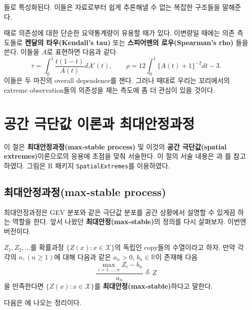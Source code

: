 \documentclass[b5paper,]{scrbook}
\theoremstyle{plain}
\theoremstyle{definition}
\numberwithin{equation}{section}
\let\BeginKnitrBlock\begin \let\EndKnitrBlock\end
\begin{document}
들로 특성화된다. 이들은 자료로부터 쉽게 추론해낼 수 없는 복잡한 구조들을 말해준다.

때로 의존성에 대한 단순한 요약통계량이 유용할 때가 있다. 이변량일 때에는 의존 측도들로 \textbf{켄달의 타우(Kendall's tau)} 또는 \textbf{스피어맨의 로우(Spearman's rho)} 들을 쓴다. 이들을 \(A\)로 표현하면 다음과 같다.
\[\tau=\int_{0}^{1}\frac{t(1-t)}{A(t)}dA'(t), \qquad{\rho = 12\int_{0}^{1}\{A(t)+1\}^{-2}dt-3.}\]
이들은 두 마진의 overall dependence를 잰다. 그러나 때대로 우리는 꼬리에서의 extreme observation들의 의존성을 재는 측도에 좀 더 관심이 있을 것이다.

\hypertarget{spatextremes}{%
\chapter{공간 극단값 이론과 최대안정과정}\label{spatextremes}}

이 절은 \textbf{최대안정과정(max-stable process)} 및 이것의 \textbf{공간 극단값(spatial extremes)}이론으로의 응용에 초점을 맞춰 서술한다. 이 절의 서술 내용은 \citep{Coles2001}과 \citep{Dey2015}를 참고하였다. 그림은 R 패키지 \texttt{SpatialExtremes}를 이용하였다.

\hypertarget{max-stable-process}{%
\section{최대안정과정(max-stable process)}\label{max-stable-process}}

최대안정과정은 GEV 분포와 같은 극단값 분포를 공간 상황에서 설명할 수 있게끔 하는 역할을 한다. 앞서 나왔던 \textbf{최대안정(max-stable)}의 정의를 다시 살펴보자. 이번엔 \citep{Dey2015} 버전이다.

\BeginKnitrBlock{definition}[최대안정과정의 다른 정의]
\protect\hypertarget{def:unnamed-chunk-459}{}{\label{def:unnamed-chunk-459} {} }\(Z_{1}, Z_{2},\ldots\)를 확률과정 \(\{Z(x):x\in\mathcal{X} \}\)의 독립인 copy들의 수열이라고 하자. 만약 각각의 \(n, (n\geq 1)\)에 대해 다음과 같은 \(a_{n}>0\), \(b_{n}\in\mathbb{R}\)이 존재해 다음
\[
\begin{equation}
\frac{\max_{i=1,\ldots ,n}Z_{i}-b_{n}}{a_{n}}\stackrel{d}{=}Z
\end{equation}
\]
을 만족한다면 \(\{Z(x):x\in\mathcal{X} \}\)를 \textbf{최대안정(max-stable)}하다고 말한다.
\EndKnitrBlock{definition}

다음은 \citep{DeHaan1984}에 나오는 정리이다.
\end{document}
